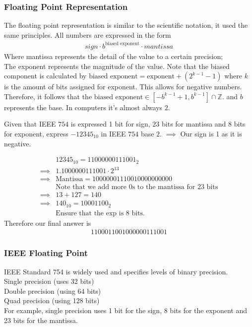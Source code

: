 \documentclass[a4paper]{article}
\theoremstyle{plain}
\theoremstyle{definition}
\newtheorem{exmp}{Example}[section]
\theoremstyle{remark}
\begin{document}
\subsubsection{Floating Point Representation}
The floating point representation is similar to the scientific notation, it used the same principles. All numbers are expressed in the form
\begin{align*}
	sign \cdot b^{\text{biased exponent}} \cdot mantissa
\end{align*}
Where mantissa represents the detail of the value to a certain precision; \\
The exponent represents the magnitude of the value. Note that the biased component is calculated by $\text{biased exponent}=\text{exponent}+(2^{k-1}-1)$ where $k$ is the amount of bits assigned for exponent. This allows for negative numbers. Therefore, it follows that the $\text{biased exponent} \in [-b^{k-1}+1,b^{k-1}] \cap \mathbb{Z}$. and $b$ represents the base. In computers it's almost always $2$.
\begin{tcolorbox}[colback=black!3!white,colframe=black!60!white,title=\begin{exmp}Base 10 \label{Base 10}\end{exmp}]
Given that IEEE $754$ is expressed 1 bit for sign, 23 bits for mantissa and 8 bits for exponent, express $-12345_{10}$ in IEEE $754$ base $2$. $\implies$ Our sign is 1 as it is negative. 

                \begin{align}
			&12345_{10}=11000000111001_2  \\
			\implies & 1.1000000111001 \cdot 2^{13}\\
			\implies & \text{Mantissa}=10000001110010000000000 \\
				 &\text{Note that we add more $0 $s to the mantissa for 23 bits}\\
			\implies & 13+127=140\\
			\implies & 140_{10}=10001100_2\\
				 & \text{Ensure that the exp is 8 bits.}
                \end{align}
		Therefore our final answer is
		\begin{align}
		1100011001000000111001
		\end{align}
\end{tcolorbox}
\subsubsection{IEEE Floating Point}
IEEE Standard 754 is widely used and specifies levels of binary precision.\\
Single precision (uses 32 bits)\\
Double precision (using 64 bits) \\
Quad precision (using 128 bits) \\
For example, single precision uses 1 bit for the sign, 8 bits for the exponent and 23 bits for the mantissa.
\end{document}
